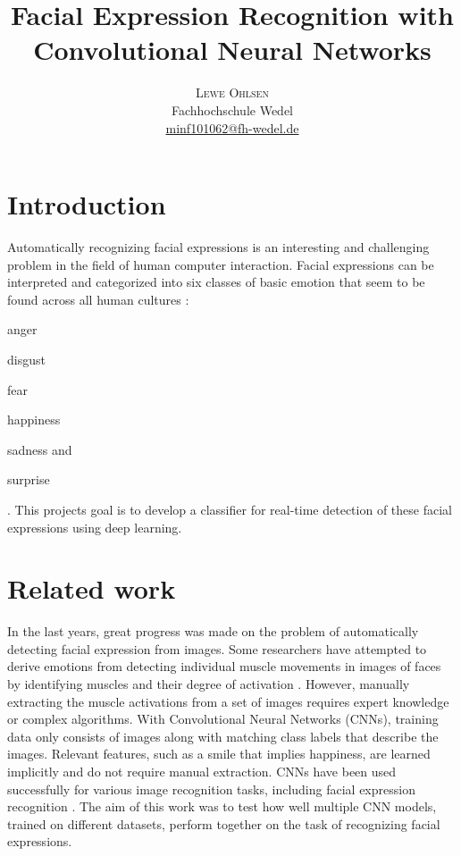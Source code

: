 \documentclass[twoside]{article}
\title{\vspace{-15mm}\fontsize{16pt}{10pt}\selectfont\textbf{Facial Expression Recognition with\\ Convolutional Neural Networks}} %
\author{
	\large
	\textsc{Lewe Ohlsen}\\[2mm] %
	\normalsize Fachhochschule Wedel \\ %
	\normalsize \href{mailto:minf101062@fh-wedel.de}{minf101062@fh-wedel.de} %
	\vspace{-5mm}
}
\date{}
\begin{document}
\maketitle %


\begin{multicols}{2} %

\section{Introduction}

Automatically recognizing facial expressions is an interesting and challenging problem in the field of human computer interaction. Facial expressions can be interpreted and categorized into six classes of basic emotion that seem to be found across all human cultures \cite{ekman93}: 
\begin{enumerate*}[]
\item anger
\item disgust
\item fear
\item happiness
\item sadness and
\item surprise
\end{enumerate*}. This projects goal is to develop a classifier for real-time detection of these facial expressions using deep learning.


\section{Related work}
In the last years, great progress was made on the problem of automatically detecting facial expression from images. Some researchers have attempted to derive emotions from detecting individual muscle movements in images of faces by identifying muscles and their degree of activation \cite{lien98}. However, manually extracting the muscle activations from a set of images requires expert knowledge or complex algorithms. With Convolutional Neural Networks (CNNs), training data only consists of images along with matching class labels that describe the images. Relevant features, such as a smile that implies happiness, are learned implicitly and do not require manual extraction. CNNs have been used successfully for various image recognition tasks, including facial expression recognition \cite{dumas01}. The aim of this work was to test how well multiple CNN models, trained on different datasets, perform together on the task of recognizing facial expressions.


\end{multicols}
\end{document}
